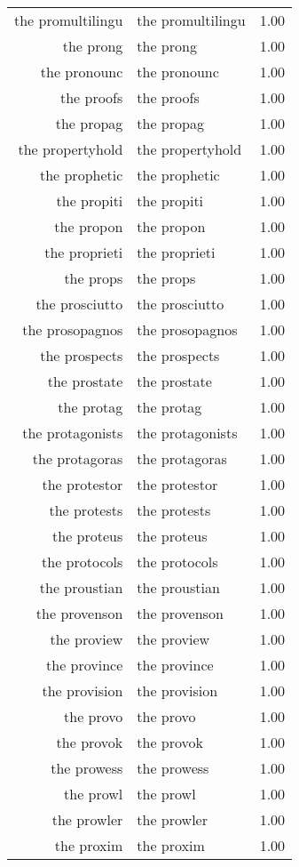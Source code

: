 \begin{table}[ht]
\begin{tabular}{rlr}
  the promultilingu & the promultilingu & 1.00 \\ 
  the prong & the prong & 1.00 \\ 
  the pronounc & the pronounc & 1.00 \\ 
  the proofs & the proofs & 1.00 \\ 
  the propag & the propag & 1.00 \\ 
  the propertyhold & the propertyhold & 1.00 \\ 
  the prophetic & the prophetic & 1.00 \\ 
  the propiti & the propiti & 1.00 \\ 
  the propon & the propon & 1.00 \\ 
  the proprieti & the proprieti & 1.00 \\ 
  the props & the props & 1.00 \\ 
  the prosciutto & the prosciutto & 1.00 \\ 
  the prosopagnos & the prosopagnos & 1.00 \\ 
  the prospects & the prospects & 1.00 \\ 
  the prostate & the prostate & 1.00 \\ 
  the protag & the protag & 1.00 \\ 
  the protagonists & the protagonists & 1.00 \\ 
  the protagoras & the protagoras & 1.00 \\ 
  the protestor & the protestor & 1.00 \\ 
  the protests & the protests & 1.00 \\ 
  the proteus & the proteus & 1.00 \\ 
  the protocols & the protocols & 1.00 \\ 
  the proustian & the proustian & 1.00 \\ 
  the provenson & the provenson & 1.00 \\ 
  the proview & the proview & 1.00 \\ 
  the province & the province & 1.00 \\ 
  the provision & the provision & 1.00 \\ 
  the provo & the provo & 1.00 \\ 
  the provok & the provok & 1.00 \\ 
  the prowess & the prowess & 1.00 \\ 
  the prowl & the prowl & 1.00 \\ 
  the prowler & the prowler & 1.00 \\ 
  the proxim & the proxim & 1.00 \\ 

\end{tabular}
\end{table}
